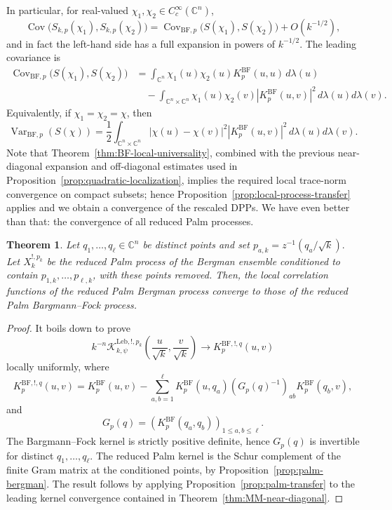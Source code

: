 \documentclass[12pt,a4paper,reqno]{article}
\theoremstyle{thmstyleone}
\newtheorem{theorem}{Theorem}[subsection]
\theoremstyle{thmstylethree}
\theoremstyle{thmstyletwo}
\numberwithin{equation}{subsection}
\def\leq{\leqslant}
\begin{document}
In particular, for real-valued $\chi_1,\chi_2\in C_c^\infty(\mathbb C^n)$,
\[
    \operatorname{Cov}\bigl(S_{k,p}(\chi_1),S_{k,p}(\chi_2)\bigr)
    =
    \operatorname{Cov}_{\mathrm{BF},p}\bigl(S(\chi_1),S(\chi_2)\bigr)
    +O(k^{-1/2}),
\]
and in fact the left-hand side has a full expansion in powers of $k^{-1/2}$. The leading covariance is
\[
\begin{aligned}
    \operatorname{Cov}_{\mathrm{BF},p}\bigl(S(\chi_1),S(\chi_2)\bigr)
    &=
    \int_{\mathbb C^n}
        \chi_1(u)\chi_2(u)K_p^{\mathrm{BF}}(u,u)\,d\lambda(u)  \\
    &\quad
    -
    \int_{\mathbb C^n\times\mathbb C^n}
        \chi_1(u)\chi_2(v)
        \left|K_p^{\mathrm{BF}}(u,v)\right|^2
        \,d\lambda(u)d\lambda(v).
\end{aligned}
\]
Equivalently, if $\chi_1=\chi_2=\chi$, then
\begin{equation}
\operatorname{Var}_{\mathrm{BF},p}(S(\chi))=\frac12\int_{\mathbb C^n\times\mathbb C^n}|\chi(u)-\chi(v)|^2\left|K_p^{\mathrm{BF}}(u,v)\right|^2\,d\lambda(u)d\lambda(v).
\end{equation}
Note that Theorem~\ref{thm:BF-local-universality}, combined with the previous near-diagonal expansion and off-diagonal estimates used in Proposition~\ref{prop:quadratic-localization}, implies the required local trace-norm convergence on compact subsets; hence Proposition~\ref{prop:local-process-transfer} applies and we obtain a convergence of the rescaled DPPs. We have even better than that: the convergence of all reduced Palm processes.

\begin{theorem}\label{thm:Palm-BF-universality}
Let $q_1,\ldots,q_\ell\in\mathbb C^n$ be distinct points and set $p_{a,k}=z^{-1}(q_a/\sqrt k).$ Let $X_k^{!,p_k}$ be the reduced Palm process of the Bergman ensemble conditioned to contain $p_{1,k},\ldots,p_{\ell,k}$, with these points removed. Then, the local correlation functions of the reduced Palm Bergman process converge to those of the reduced Palm Bargmann--Fock process.
\end{theorem}

\begin{proof}
It boils down to prove
\[
    k^{-n}\mathcal K_{k,\psi}^{\mathrm{Leb},!,p_k}
    \left(
        \frac{u}{\sqrt k},\frac{v}{\sqrt k}
    \right)
    \longrightarrow
    K^{\mathrm{BF},!,q}_p(u,v)
\]
locally uniformly, where
\[
    K^{\mathrm{BF},!,q}_p(u,v)
    =
    K^{\mathrm{BF}}_p(u,v)
    -
    \sum_{a,b=1}^\ell
    K^{\mathrm{BF}}_p(u,q_a)
    \left(G_p(q)^{-1}\right)_{ab}
    K^{\mathrm{BF}}_p(q_b,v),
\]
and
\[
    G_p(q)=
    \left(K^{\mathrm{BF}}_p(q_a,q_b)\right)_{1\leq a,b\leq \ell}.
\]
The Bargmann--Fock kernel is strictly positive definite, hence $G_p(q)$ is invertible for distinct $q_1,\ldots,q_\ell$. The reduced Palm kernel is the Schur complement of the finite Gram matrix at the conditioned points, by Proposition~\ref{prop:palm-bergman}. The result follows by applying Proposition~\ref{prop:palm-transfer} to the leading kernel convergence contained in Theorem~\ref{thm:MM-near-diagonal}.
\end{proof}
\end{document}
